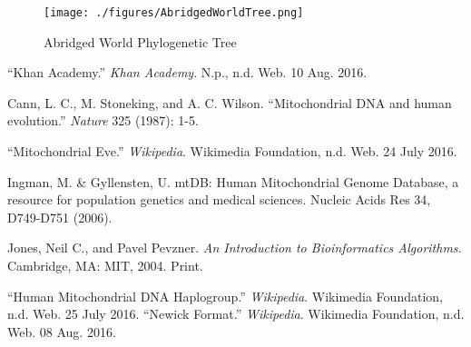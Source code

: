 \documentclass[conference]{IEEEtran}
\begin{document}
\begin{figure}[!t]
\centering
\texttt{[image: ./figures/AbridgedWorldTree.png]}
\caption{Abridged World Phylogenetic Tree}
\label{AbridgedWorldTree}
\end{figure}

\FloatBarrier
\begin{thebibliography}{1}

\enquote{Khan Academy.} \textit{Khan Academy}. N.p., n.d. Web. 10 Aug. 2016.

Cann, L. C., M. Stoneking, and A. C. Wilson. \enquote{Mitochondrial DNA and human evolution.} \textit{Nature} 325 (1987): 1-5.

\enquote{Mitochondrial Eve.} \textit{Wikipedia}. Wikimedia Foundation, n.d. Web. 24 July 2016.

Ingman, M. \& Gyllensten, U. mtDB: Human Mitochondrial Genome Database, a resource for population genetics and medical sciences. Nucleic Acids Res 34, D749-D751 (2006).

Jones, Neil C., and Pavel Pevzner. \textit{An Introduction to Bioinformatics Algorithms.} Cambridge, MA: MIT, 2004. Print.

\enquote{Human Mitochondrial DNA Haplogroup.} \textit{Wikipedia}. Wikimedia Foundation, n.d. Web. 25 July 2016.
\enquote{Newick Format.} \textit{Wikipedia}. Wikimedia Foundation, n.d. Web. 08 Aug. 2016.
\end{thebibliography}
\end{document}
